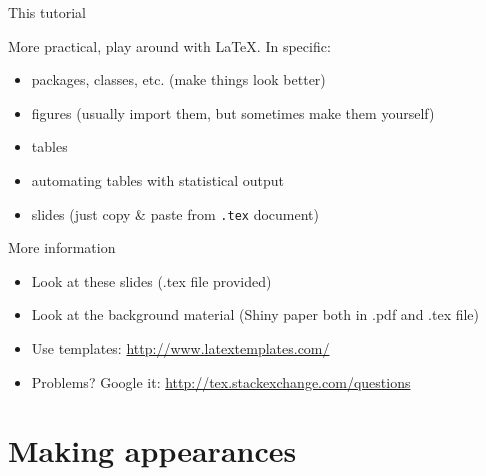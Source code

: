 \documentclass[ignorenonframetext,]{beamer}
\begin{document}
\begin{frame}{This tutorial}

More practical, play around with \LaTeX. In specific:

\begin{itemize}
\itemsep1pt\parskip0pt
\item
  packages, classes, etc. (make things look better)
\item
  figures (usually import them, but sometimes make them yourself)
\item
  tables   
  \item automating tables with statistical output
\item
  slides (just copy \& paste from \texttt{.tex} document)
\end{itemize}
\end{frame}

\begin{frame}{More information}
	\begin{itemize}
		\item Look at these slides (.tex file provided)
		\newline
		\item Look at the background material (Shiny paper both in .pdf and .tex file)
		\newline
		\item Use templates: \url{http://www.latextemplates.com/}
		\newline
		\item Problems? Google it: \url{http://tex.stackexchange.com/questions}
	\end{itemize}
\end{frame}

\section{Making appearances}\label{making-appearances}
\end{document}
